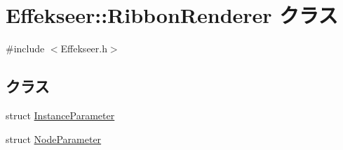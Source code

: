 \hypertarget{class_effekseer_1_1_ribbon_renderer}{}\section{Effekseer\+:\+:Ribbon\+Renderer クラス}
\label{class_effekseer_1_1_ribbon_renderer}


{\ttfamily \#include $<$Effekseer.\+h$>$}

\subsection*{クラス}
\begin{DoxyCompactItemize}
\item 
struct \mbox{\hyperlink{struct_effekseer_1_1_ribbon_renderer_1_1_instance_parameter}{Instance\+Parameter}}
\item 
struct \mbox{\hyperlink{struct_effekseer_1_1_ribbon_renderer_1_1_node_parameter}{Node\+Parameter}}
\end{DoxyCompactItemize}
